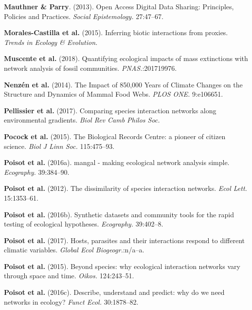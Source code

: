 \leavevmode\hypertarget{ref-MautParr13}{}%
\textbf{Mauthner \& Parry}. (2013). Open Access Digital Data Sharing:
Principles, Policies and Practices. \emph{Social Epistemology.}
27:47--67.

\leavevmode\hypertarget{ref-MoraMati15}{}%
\textbf{Morales-Castilla et al.} (2015). Inferring biotic interactions
from proxies. \emph{Trends in Ecology \& Evolution.}

\leavevmode\hypertarget{ref-MuscPrab18}{}%
\textbf{Muscente et al.} (2018). Quantifying ecological impacts of mass
extinctions with network analysis of fossil communities.
\emph{PNAS.}:201719976.

\leavevmode\hypertarget{ref-NenzMont14}{}%
\textbf{Nenzén et al.} (2014). The Impact of 850,000 Years of Climate
Changes on the Structure and Dynamics of Mammal Food Webs. \emph{PLOS
ONE.} 9:e106651.

\leavevmode\hypertarget{ref-PellAlbo17}{}%
\textbf{Pellissier et al.} (2017). Comparing species interaction
networks along environmental gradients. \emph{Biol Rev Camb Philos Soc.}

\leavevmode\hypertarget{ref-PocoRoy15}{}%
\textbf{Pocock et al.} (2015). The Biological Records Centre: a pioneer
of citizen science. \emph{Biol J Linn Soc.} 115:475--93.

\leavevmode\hypertarget{ref-PoisBais16}{}%
\textbf{Poisot et al.} (2016a). mangal - making ecological network
analysis simple. \emph{Ecography.} 39:384--90.

\leavevmode\hypertarget{ref-PoisCana12}{}%
\textbf{Poisot et al.} (2012). The dissimilarity of species interaction
networks. \emph{Ecol Lett.} 15:1353--61.

\leavevmode\hypertarget{ref-PoisGrav16}{}%
\textbf{Poisot et al.} (2016b). Synthetic datasets and community tools
for the rapid testing of ecological hypotheses. \emph{Ecography.}
39:402--8.

\leavevmode\hypertarget{ref-PoisGuev17}{}%
\textbf{Poisot et al.} (2017). Hosts, parasites and their interactions
respond to different climatic variables. \emph{Global Ecol
Biogeogr.}:n/a--a.

\leavevmode\hypertarget{ref-PoisStou15}{}%
\textbf{Poisot et al.} (2015). Beyond species: why ecological
interaction networks vary through space and time. \emph{Oikos.}
124:243--51.

\leavevmode\hypertarget{ref-PoisStou16}{}%
\textbf{Poisot et al.} (2016c). Describe, understand and predict: why do
we need networks in ecology? \emph{Funct Ecol.} 30:1878--82.

